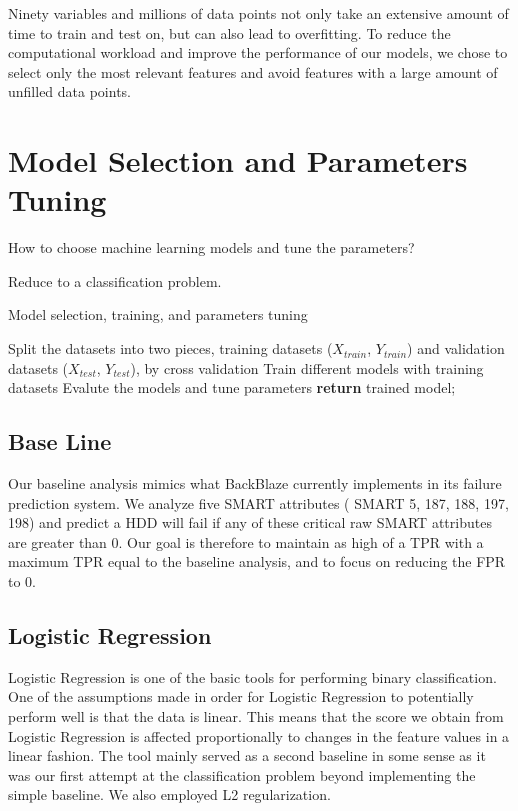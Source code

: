 \documentclass[12pt,a4paper,english]{amsart}
\begin{document}
Ninety variables and millions of data points not only take an extensive amount of time to train and test on, but can also lead to overfitting. To reduce the computational workload and improve the performance of our models, we chose   to   select   only   the   most   relevant   features   and   avoid   features   with   a   large   amount   of   unfilled   data   points.
%
\section{Model Selection and Parameters Tuning}

How to choose machine learning models and tune the parameters?

Reduce to a classification problem.

\begin{algorithm}  
	\caption{Model selection, training, and parameters tuning}
	\LinesNumbered  
	Split the datasets into two pieces, training datasets ($X_{train}$, $Y_{train}$) and validation datasets ($X_{test}$, $Y_{test}$), by cross validation\;
	Train different models with training datasets\;
	{
		Evalute the models and tune parameters
	}
	\textbf{return} trained model;
\end{algorithm}  

\subsection*{Base Line}

Our baseline analysis mimics what BackBlaze currently implements in its failure prediction system. We analyze five SMART attributes ( SMART 5, 187, 188, 197, 198) and predict a HDD will fail if any of these critical raw SMART   attributes   are   greater   than   0.
Our goal is therefore to maintain as high of a TPR with a maximum TPR equal to the baseline analysis, and to focus   on   reducing   the   FPR   to   0.

\subsection*{Logistic Regression}

Logistic Regression is one of the basic tools for performing binary classification. One of the assumptions made in order for Logistic Regression to potentially perform well is that the data is linear. This means that the score we obtain from Logistic Regression is affected proportionally to changes in the feature values in a linear fashion. The tool mainly served as a second baseline in some sense as it was our first attempt at the classification problem beyond implementing   the   simple   baseline.   We   also   employed   L2   regularization.
\end{document}
